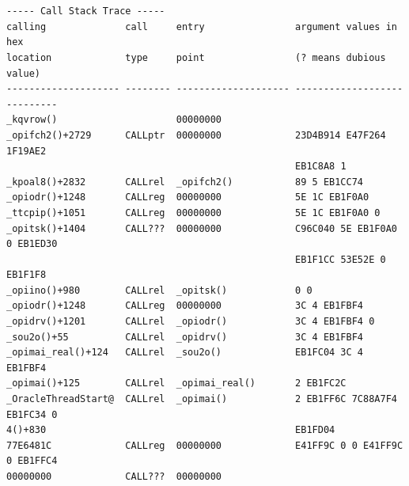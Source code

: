 \section{}


\begin{lstlisting}
----- Call Stack Trace -----
calling              call     entry                argument values in hex      
location             type     point                (? means dubious value)     
-------------------- -------- -------------------- ----------------------------
_kqvrow()                     00000000             
_opifch2()+2729      CALLptr  00000000             23D4B914 E47F264 1F19AE2
                                                   EB1C8A8 1
_kpoal8()+2832       CALLrel  _opifch2()           89 5 EB1CC74
_opiodr()+1248       CALLreg  00000000             5E 1C EB1F0A0
_ttcpip()+1051       CALLreg  00000000             5E 1C EB1F0A0 0
_opitsk()+1404       CALL???  00000000             C96C040 5E EB1F0A0 0 EB1ED30
                                                   EB1F1CC 53E52E 0 EB1F1F8
_opiino()+980        CALLrel  _opitsk()            0 0
_opiodr()+1248       CALLreg  00000000             3C 4 EB1FBF4
_opidrv()+1201       CALLrel  _opiodr()            3C 4 EB1FBF4 0
_sou2o()+55          CALLrel  _opidrv()            3C 4 EB1FBF4
_opimai_real()+124   CALLrel  _sou2o()             EB1FC04 3C 4 EB1FBF4
_opimai()+125        CALLrel  _opimai_real()       2 EB1FC2C
_OracleThreadStart@  CALLrel  _opimai()            2 EB1FF6C 7C88A7F4 EB1FC34 0
4()+830                                            EB1FD04
77E6481C             CALLreg  00000000             E41FF9C 0 0 E41FF9C 0 EB1FFC4
00000000             CALL???  00000000             
\end{lstlisting}




